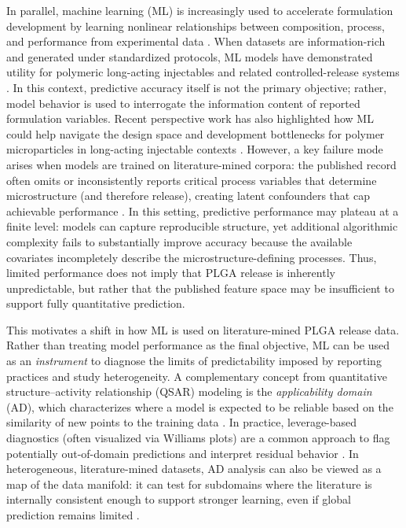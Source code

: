 \documentclass[preprint,12pt,authoryear]{elsarticle}
\begin{document}
In parallel, machine learning (ML) is increasingly used to accelerate formulation development by learning nonlinear relationships between composition, process, and performance from experimental data \citep{Bannigan2021}. When datasets are information-rich and generated under standardized protocols, ML models have demonstrated utility for polymeric long-acting injectables and related controlled-release systems \citep{Bannigan2023LAI}. In this context, predictive accuracy itself is not the primary objective; rather, model behavior is used to interrogate the information content of reported formulation variables. Recent perspective work has also highlighted how ML could help navigate the design space and development bottlenecks for polymer microparticles in long-acting injectable contexts \citep{Bao2025IJP}. However, a key failure mode arises when models are trained on literature-mined corpora: the published record often omits or inconsistently reports critical process variables that determine microstructure (and therefore release), creating latent confounders that cap achievable performance \citep{Jain2000,Fredenberg2011}. In this setting, predictive performance may plateau at a finite level: models can capture reproducible structure, yet additional algorithmic complexity fails to substantially improve accuracy because the available covariates incompletely describe the microstructure-defining processes. Thus, limited performance does not imply that PLGA release is inherently unpredictable, but rather that the published feature space may be insufficient to support fully quantitative prediction.


This motivates a shift in how ML is used on literature-mined PLGA release data. Rather than treating model performance as the final objective, ML can be used as an \emph{instrument} to diagnose the limits of predictability imposed by reporting practices and study heterogeneity. A complementary concept from quantitative structure--activity relationship (QSAR) modeling is the \emph{applicability domain} (AD), which characterizes where a model is expected to be reliable based on the similarity of new points to the training data \citep{OECD2004QSAR,Netzeva2005AD}. In practice, leverage-based diagnostics (often visualized via Williams plots) are a common approach to flag potentially out-of-domain predictions and interpret residual behavior \citep{WeaverGleeson2008}. In heterogeneous, literature-mined datasets, AD analysis can also be viewed as a map of the data manifold: it can test for subdomains where the literature is internally consistent enough to support stronger learning, even if global prediction remains limited \citep{Netzeva2005AD,WeaverGleeson2008}.
\end{document}
